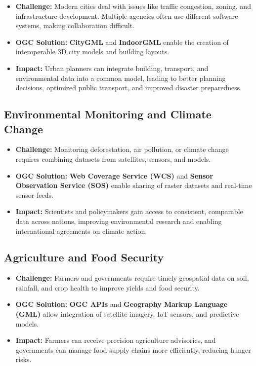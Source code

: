 \documentclass[
  11pt,
  letterpaper,
]{book}
\providecommand{\tightlist}{%
  \setlength{\itemsep}{0pt}\setlength{\parskip}{0pt}}
\begin{document}
\begin{itemize}
\tightlist
\item
  \textbf{Challenge:} Modern cities deal with issues like traffic
  congestion, zoning, and infrastructure development. Multiple agencies
  often use different software systems, making collaboration
  difficult.\\
\item
  \textbf{OGC Solution:} \textbf{CityGML} and \textbf{IndoorGML} enable
  the creation of interoperable 3D city models and building layouts.\\
\item
  \textbf{Impact:} Urban planners can integrate building, transport, and
  environmental data into a common model, leading to better planning
  decisions, optimized public transport, and improved disaster
  preparedness.
\end{itemize}

\subsection{Environmental Monitoring and Climate
Change}\label{environmental-monitoring-and-climate-change}

\begin{itemize}
\tightlist
\item
  \textbf{Challenge:} Monitoring deforestation, air pollution, or
  climate change requires combining datasets from satellites, sensors,
  and models.\\
\item
  \textbf{OGC Solution:} \textbf{Web Coverage Service (WCS)} and
  \textbf{Sensor Observation Service (SOS)} enable sharing of raster
  datasets and real-time sensor feeds.\\
\item
  \textbf{Impact:} Scientists and policymakers gain access to
  consistent, comparable data across nations, improving environmental
  research and enabling international agreements on climate action.
\end{itemize}

\subsection{Agriculture and Food
Security}\label{agriculture-and-food-security}

\begin{itemize}
\tightlist
\item
  \textbf{Challenge:} Farmers and governments require timely geospatial
  data on soil, rainfall, and crop health to improve yields and food
  security.\\
\item
  \textbf{OGC Solution:} \textbf{OGC APIs} and \textbf{Geography Markup
  Language (GML)} allow integration of satellite imagery, IoT sensors,
  and predictive models.\\
\item
  \textbf{Impact:} Farmers can receive precision agriculture advisories,
  and governments can manage food supply chains more efficiently,
  reducing hunger risks.
\end{itemize}
\end{document}
